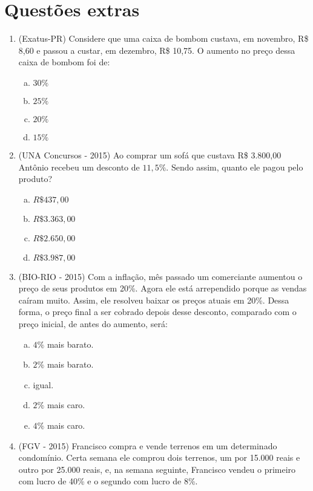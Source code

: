  \section{Questões extras}
\begin{enumerate}

   \item (Exatus-PR) Considere que uma caixa de bombom custava, em novembro, R\$ 8,60 e passou a custar, em dezembro, R\$ 10,75. O aumento no preço dessa caixa de bombom foi de:
  \begin{enumerate}[a)]
  \item $30\%$
  \item $25\%$
  \item $20\%$
  \item $15\%$
  \end{enumerate}
  
    \item (UNA Concursos - 2015) Ao comprar um sofá que custava R\$ 3.800,00 Antônio recebeu um desconto de $11,5\%$. Sendo assim, quanto ele pagou pelo produto?
   \begin{enumerate}[a)]
  \item $R\$ 437,00$
  \item $R\$ 3.363,00$
  \item $R\$ 2.650,00$
  \item $R\$ 3.987,00$
  \end{enumerate}
  
  \item (BIO-RIO - 2015) Com a inflação, mês passado um comerciante aumentou o preço de seus produtos em 20\%. Agora ele está arrependido porque as vendas caíram muito. Assim, ele resolveu baixar os preços atuais em 20\%. Dessa forma, o preço final a ser cobrado depois desse desconto, comparado com o preço inicial, de antes do aumento, será:
  \begin{enumerate}[a)]
  \item $4\%$ mais barato.
  \item $2\%$ mais barato.
  \item igual.
  \item $2\%$ mais caro.
  \item $4\%$ mais caro.
  \end{enumerate}
  
  \item (FGV - 2015) Francisco compra e vende terrenos em um determinado condomínio. Certa semana ele comprou dois terrenos, um por 15.000 reais e outro por 25.000 reais, e, na semana seguinte, Francisco vendeu o primeiro com lucro de 40\% e o segundo com lucro de 8\%.
  

\end{enumerate}

